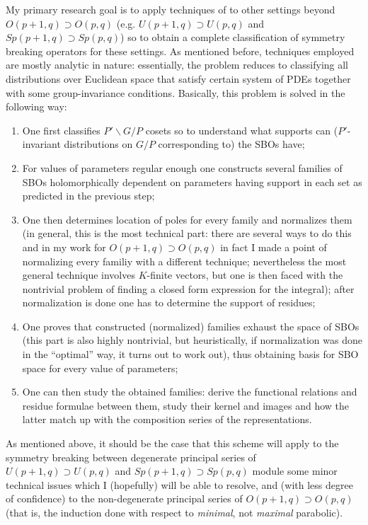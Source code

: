 \documentclass[11pt,a4paper,twoside]{jarticle}
\newcommand{\研究課題名}{Symmetry breaking operators}
\newcommand{\研究機関名}{東京大学}
\newcommand{\申請者氏名}{レオンチエフ\,オレクシィ}
\newcommand{\研究代表者氏名}{\申請者氏名}
\newcommand{\研究期間の最終元号年度}{31}	%
\begin{document}
{My primary research goal is to apply techniques of \cite{KS15} to other settings beyond $O(p+1,q)\supset O(p,q)$ (e.g. $U(p+1,q)\supset U(p,q)$ and $Sp(p+1,q)\supset Sp(p,q)$)
so to obtain a complete classification of symmetry breaking operators for these settings. As mentioned before, techniques employed are mostly analytic in nature: essentially, the problem
reduces to classifying all distributions over Euclidean space that satisfy certain system of PDEs together with some group-invariance conditions. Basically, this problem is solved in the 
following way:\begin{enumerate}
	\item One first classifies $P'\backslash G/P$ cosets so to understand what supports can ($P'$-invariant distributions on $G/P$ corresponding to) the SBOs have;
	\item For values of parameters regular enough one constructs several families of SBOs holomorphically dependent on parameters having support in each set as predicted in the previous step;
	\item One then determines location of poles for every family and normalizes them (in general, this is the most technical part: there are several ways to do this and in my work
		for $O(p+1,q)\supset O(p,q)$ in fact I made a point of normalizing every familiy with a different technique; nevertheless the most general technique involves $K$-finite vectors,
		but one is then faced with the nontrivial problem of finding a closed form expression for the integral); after normalization is done one has to determine the support of residues;
	\item One proves that constructed (normalized) families exhaust the space of SBOs (this part is also highly nontrivial, but heuristically, if normalization was done in the ``optimal'' way, it
		turns out to work out), thus obtaining basis for SBO space for every value of parameters;
	\item One can then study the obtained families: derive the functional relations and residue formulae between them, study their kernel and images and how the latter match up with the composition
		series of the representations.
\end{enumerate}
As mentioned above, it should be the case that this scheme will apply to the symmetry breaking between degenerate principal series of $U(p+1,q)\supset U(p,q)$ and $Sp(p+1,q)\supset Sp(p,q)$
module some minor technical issues which I (hopefully) will be able to resolve,
and (with less degree of confidence) to the non-degenerate principal series of $O(p+1,q)\supset O(p,q)$ (that is, the induction done with respect to \textit{minimal}, not \textit{maximal} parabolic).
}
\end{document}
